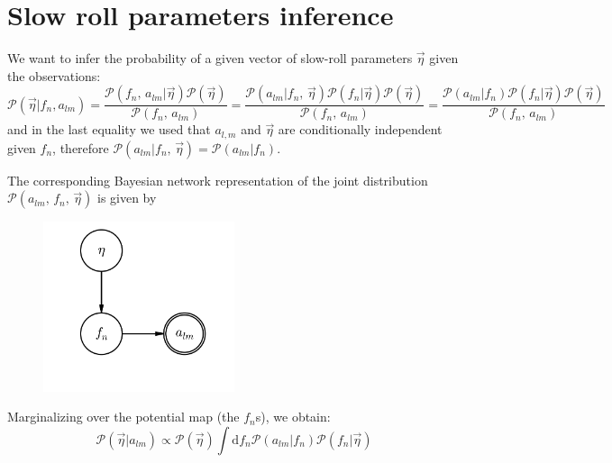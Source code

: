 \documentclass[prd, onecolumn, floatfix, letterpaper, nofootinbib, amsmath, amssymb, superscriptaddress]{revtex4}
\renewcommand{\(}{\left(}
\renewcommand{\)}{\right)}
\renewcommand{\[}{\left[}
\renewcommand{\]}{\right]}
\def\be{\begin{equation}}
\def\ee{\end{equation}}
\begin{document}
 \section{Slow roll parameters inference}
 
 We want to infer the probability of a given vector of slow-roll parameters $\vec{\eta}$ given the observations:
 \be
 	\mathcal{P}(\vec{\eta}| f_n, a_{lm})=\frac{\mathcal{P}( f_n, \, a_{lm}|\vec{\eta})\mathcal{P}(\vec{\eta})}{\mathcal{P}( f_n,\, a_{lm})}=\frac{\mathcal{P}( a_{lm}| f_n,\,\vec{\eta}) \mathcal{P}( f_n|\vec{\eta})\mathcal{P}(\vec{\eta})}{\mathcal{P}( f_n, \, a_{lm})} = \frac{\mathcal{P}( a_{lm}| f_n) \mathcal{P}( f_n|\vec{\eta})\mathcal{P}(\vec{\eta})}{\mathcal{P}( f_n, \, a_{lm})}
 \ee
 and in the last equality we used that $a_{l,m}$ and $\vec{\eta}$ are conditionally independent given $f_n$, therefore $\mathcal{P}( a_{lm}| f_n, \,\vec{\eta})= \mathcal{P}( a_{lm}| f_n)$. 

The corresponding Bayesian network representation of the joint distribution $\mathcal{P}(a_{lm},\,f_n,\,\vec{\eta} )$ is given by

\begin{figure}[h]
\begin{center}
\centering
\includegraphics[width=0.50\textwidth]{inflation.png}\\
\caption{\label{inflationPGM}
}

\end{center}
\end{figure} 
 Marginalizing over the potential map (the $f_n$s), we obtain:
 \be
 	\mathcal{P}(\vec{\eta}| a_{lm} )\propto\mathcal{P}(\vec{\eta})\int \mathrm{d}f_n\mathcal{P}( a_{lm}| f_n) \mathcal{P}( f_n|\vec{\eta})
 \ee
\end{document}
